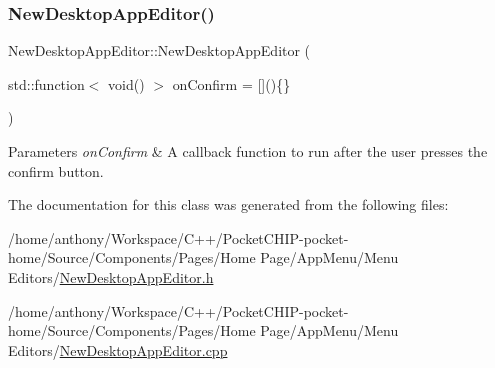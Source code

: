 \subsubsection{\texorpdfstring{New\+Desktop\+App\+Editor()}{NewDesktopAppEditor()}}
{\footnotesize\ttfamily New\+Desktop\+App\+Editor\+::\+New\+Desktop\+App\+Editor (\begin{DoxyParamCaption}\item[{std\+::function$<$ void() $>$}]{on\+Confirm = {\ttfamily \mbox{[}\mbox{]}()\{\}} }\end{DoxyParamCaption})}


\begin{DoxyParams}{Parameters}
{\em on\+Confirm} & A callback function to run after the user presses the confirm button. \\
\hline
\end{DoxyParams}


The documentation for this class was generated from the following files\+:\begin{DoxyCompactItemize}
\item 
/home/anthony/\+Workspace/\+C++/\+Pocket\+C\+H\+I\+P-\/pocket-\/home/\+Source/\+Components/\+Pages/\+Home Page/\+App\+Menu/\+Menu Editors/\mbox{\hyperlink{NewDesktopAppEditor_8h}{New\+Desktop\+App\+Editor.\+h}}\item 
/home/anthony/\+Workspace/\+C++/\+Pocket\+C\+H\+I\+P-\/pocket-\/home/\+Source/\+Components/\+Pages/\+Home Page/\+App\+Menu/\+Menu Editors/\mbox{\hyperlink{NewDesktopAppEditor_8cpp}{New\+Desktop\+App\+Editor.\+cpp}}\end{DoxyCompactItemize}

